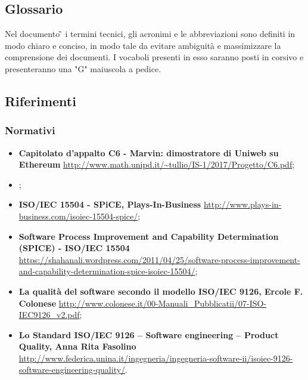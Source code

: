 \subsection{Glossario}
Nel documento \G{} i termini tecnici, gli acronimi e le abbreviazioni sono definiti in modo chiaro e conciso, in modo tale da evitare ambiguità e massimizzare la comprensione dei documenti.
\newline I vocaboli presenti in esso saranno posti in corsivo e presenteranno una "G" maiuscola a pedice.
\subsection{Riferimenti}
\subsubsection{Normativi}
\begin{itemize}
	\item
	\textbf{Capitolato d’appalto C6 - Marvin: dimostratore di Uniweb su Ethereum}
	\url{http://www.math.unipd.it/~tullio/IS-1/2017/Progetto/C6.pdf};
	
	\item
	\textbf{\NdP{}};
	 
	\item
	\textbf{ISO/IEC 15504 - SPiCE, Plays-In-Business}
	\url{http://www.plays-in-business.com/isoiec-15504-spice/};
	
	\item
	\textbf{Software Process Improvement and Capability Determination (SPICE) - ISO/IEC 15504}
	\url{https://shahanali.wordpress.com/2011/04/25/software-process-improvement-and-capability-determination-spice-isoiec-15504/};	
	\item
	\textbf{La qualità del software secondo il modello ISO/IEC 9126, Ercole F. Colonese}
	\url{http://www.colonese.it/00-Manuali_Pubblicatii/07-ISO-IEC9126_v2.pdf};
	\item
	\textbf{Lo Standard ISO/IEC 9126 – Software engineering – Product Quality, Anna Rita Fasolino}
	\url{http://www.federica.unina.it/ingegneria/ingegneria-software-ii/isoiec-9126-software-engineering-quality/}.
\end{itemize}

